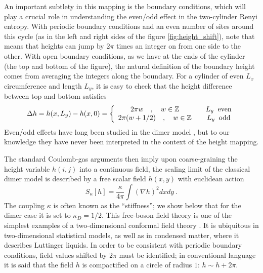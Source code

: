 \documentclass[11pt]{iopart}
\begin{document}
An important subtlety in this mapping is the boundary conditions, which will play a crucial role in understanding the even/odd effect in the two-cylinder Renyi entropy.
With periodic boundary conditions and an even number of sites around this cycle (as in the left and right sides of the figure \ref{fig:height_shift}), note that means that heights can jump by $2\pi$ times an integer on from one side to the other. 
With open boundary conditions, as we have at the ends of the cylinder (the top and bottom of the figure), the natural definition of the boundary height comes from averaging the integers along the boundary. For a cylinder of even $L_x$ circumference and length $L_y$, it is easy to check that the height difference between top and bottom satisfies \cite{Ferdinand}
\begin{equation}
 \Delta h=h(x,L_y)-h(x,0)=\left\{
 \begin{array}{ccc}
  2\pi w \quad,\quad w\in \mathbb{Z}&&L_y \;\;{\rm even}\\
  2\pi (w+1/2) \quad,\quad w\in \mathbb{Z}&&L_y \;\;{\rm odd}
 \end{array}
 \right.
\end{equation}
Even/odd effects have long been studied in the dimer model \cite{Ferdinand,Dimers_all,Ruelledimers}, but to our knowledge they have never been interpreted in the context of the height mapping. 

 
The standard Coulomb-gas arguments \cite{Nienhuis} then imply upon coarse-graining the height variable $h(i,j)$ into a continuous field, the scaling limit of the classical dimer model is described by a free scalar field $h(x,y)$ with euclidean action
 \begin{equation}\label{eq:free_field_bis}
  S_\kappa[h]=\frac{\kappa}{4\pi}\int \left(\nabla h\right)^2 dx dy\ .
 \end{equation}
The coupling $\kappa$ is often known as the ``stiffness''; we show below that for the dimer case it is set to $\kappa_D=1/2$. This free-boson field theory is one of the simplest examples of a two-dimensional conformal field theory \cite{Ginsparg}. It is ubiquitous in two-dimensional statistical models, as well as in condensed matter, where it describes Luttinger liquids.  In order to be consistent with periodic boundary conditions, field values shifted by $2\pi$ must be identified; in conventional language it is said that the field $h$ is compactified on a circle of radius $1$: $h\sim h+2\pi$. 
\end{document}
